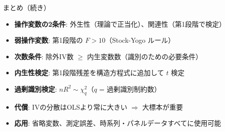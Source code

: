 \documentclass[
  ignorenonframetext,
]{beamer}
\providecommand{\tightlist}{%
  \setlength{\itemsep}{0pt}\setlength{\parskip}{0pt}}
\begin{document}
\begin{frame}{まとめ（続き）}
\label{ux307eux3068ux3081ux7d9aux304d}
\begin{itemize}
\tightlist
\item
  \textbf{操作変数の2条件}:
  外生性（理論で正当化）、関連性（第1段階で検定）
\item
  \textbf{弱操作変数}: 第1段階の \(F > 10\)（Stock-Yogo ルール）
\item
  \textbf{次数条件}: 除外IV数 \(\geq\)
  内生変数数（識別のための必要条件）
\item
  \textbf{内生性検定}: 第1段階残差を構造方程式に追加して \(t\) 検定
\item
  \textbf{過剰識別検定}: \(nR^2 \sim \chi^2_q\)（\(q\) =
  過剰識別制約数）
\item
  \textbf{代償}: IVの分散はOLSより常に大きい \(\Rightarrow\)
  大標本が重要
\item
  \textbf{応用}:
  省略変数、測定誤差、時系列・パネルデータすべてに使用可能
\end{itemize}
\end{frame}
\end{document}
